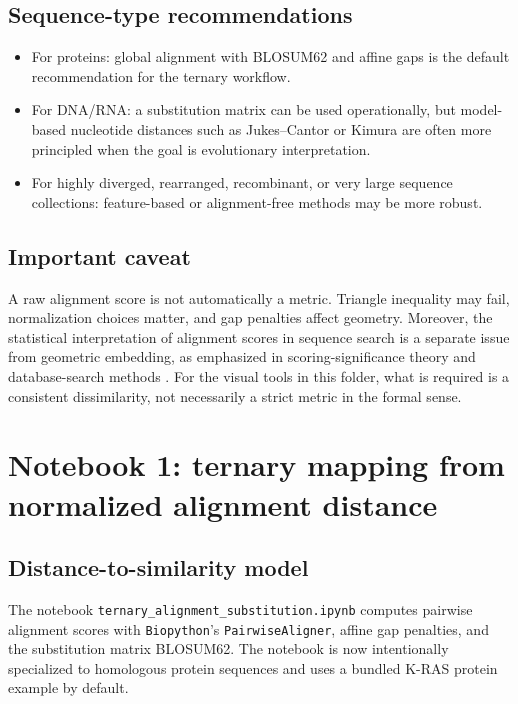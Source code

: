 \documentclass[11pt,a4paper]{article}
\begin{document}
\subsection{Sequence-type recommendations}

\begin{itemize}[leftmargin=*]
\item For proteins: global alignment with BLOSUM62 and affine gaps is the default recommendation for the ternary workflow.
\item For DNA/RNA: a substitution matrix can be used operationally, but model-based nucleotide distances such as Jukes--Cantor or Kimura are often more principled when the goal is evolutionary interpretation.
\item For highly diverged, rearranged, recombinant, or very large sequence collections: feature-based or alignment-free methods may be more robust.
\end{itemize}

\subsection{Important caveat}

A raw alignment score is not automatically a metric. Triangle inequality may fail, normalization choices matter, and gap penalties affect geometry. Moreover, the statistical interpretation of alignment scores in sequence search is a separate issue from geometric embedding, as emphasized in scoring-significance theory and database-search methods \cite{Karlin1990,Altschul1997}. For the visual tools in this folder, what is required is a consistent dissimilarity, not necessarily a strict metric in the formal sense.

\section{Notebook 1: ternary mapping from normalized alignment distance}

\subsection{Distance-to-similarity model}

The notebook \texttt{ternary\_alignment\_substitution.ipynb} computes pairwise alignment scores with \texttt{Biopython}'s \texttt{PairwiseAligner}, affine gap penalties, and the substitution matrix BLOSUM62. The notebook is now intentionally specialized to homologous protein sequences and uses a bundled K-RAS protein example by default.
\end{document}

